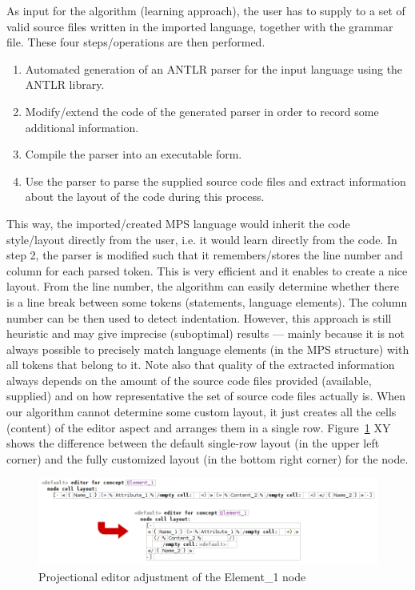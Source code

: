 As input for the algorithm (learning approach), the user has to supply to a set of valid source files written in the imported language, together with the grammar file.
These four steps/operations are then performed.
\begin{enumerate}
	\item Automated generation of an ANTLR parser for the input language using the ANTLR library.
	\item Modify/extend the code of the generated parser in order to record some additional information.
	\item Compile the parser into an executable form.
	\item Use the parser to parse the supplied source code files and extract information about the layout of the code during this process.
\end{enumerate}
This way, the imported/created MPS language would inherit the code style/layout directly from the user, i.e. it would learn directly from the code.
In step 2, the parser is modified such that it remembers/stores the line number and column for each parsed token.
This is very efficient and it enables to create a nice layout.
From the line number, the algorithm can easily determine whether there is a line break between some tokens (statements, language elements).
The column number can be then used to detect indentation.
However, this approach is still heuristic and may give imprecise (suboptimal) results --- mainly because it is not always possible to precisely match language elements (in the MPS structure) with all tokens that belong to it.
Note also that quality of the extracted information always depends on the amount of the source code files provided (available, supplied) and on how representative the set of source code files actually is.
When our algorithm cannot determine some custom layout, it just creates all the cells (content) of the editor aspect and arranges them in a single row.
Figure~\ref{fig:editor_adjustment} XY shows the difference between the default single-row layout (in the upper left corner) and the fully customized layout (in the bottom right corner) for the  node.

\begin{figure}[ht]
	\centering
	\includegraphics[scale=0.5]{./images/editor_adjustment.png}
	\caption{Projectional editor adjustment of the Element{\_}1 node}
	\label{fig:editor_adjustment}
\end{figure}

